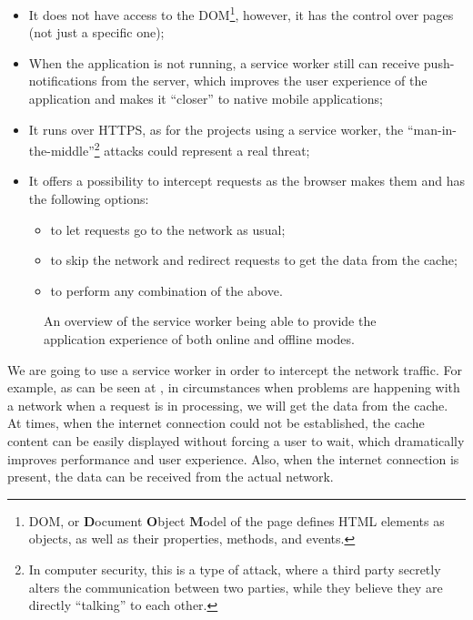 \begin{itemize}
\item{It does not have access to the DOM\footnote{DOM, or \textbf{D}ocument \textbf{O}bject \textbf{M}odel of the page defines HTML elements as objects, as well as their properties, methods, and events.}, however, it has the control over pages (not just a specific one);}
\item{When the application is not running, a service worker still can receive push-notifications from the server\cite{32}, which improves the user experience of the application and makes it ``closer'' to native mobile applications;}

\item{It runs over HTTPS, as for the projects using a service worker, the ``man-in-the-middle''\footnote{In computer security, this is a type of attack, where a third party secretly alters the communication between two parties, while they believe they are directly ``talking'' to each other\cite{33}.} attacks could represent a real threat;}
\item{It offers a possibility to intercept requests as the browser makes them and has the following options:}
\begin{itemize}
\item{to let requests go to the network as usual;}
\item{to skip the network and redirect requests to get the data from the cache;}
\item{to perform any combination of the above.}
\end{itemize}
\end{itemize}

\begin{figure}[!htb]
    \begin{center}
    \def\svgwidth{0.7\linewidth}
    
    \caption {An overview of the service worker being able to provide the application experience of both online and offline modes.}
    \label{fig:sw_interact}
\end{center}
\end{figure}

We are going to use a service worker in order to intercept the network traffic. For example, as can be seen at , in circumstances when problems are happening with a network when a request is in processing, we will get the data from the cache. At times, when the internet connection could not be established, the cache content can be easily displayed without forcing a user to wait, which dramatically improves performance and user experience. Also, when the internet connection is present, the data can be received from the actual network. 

